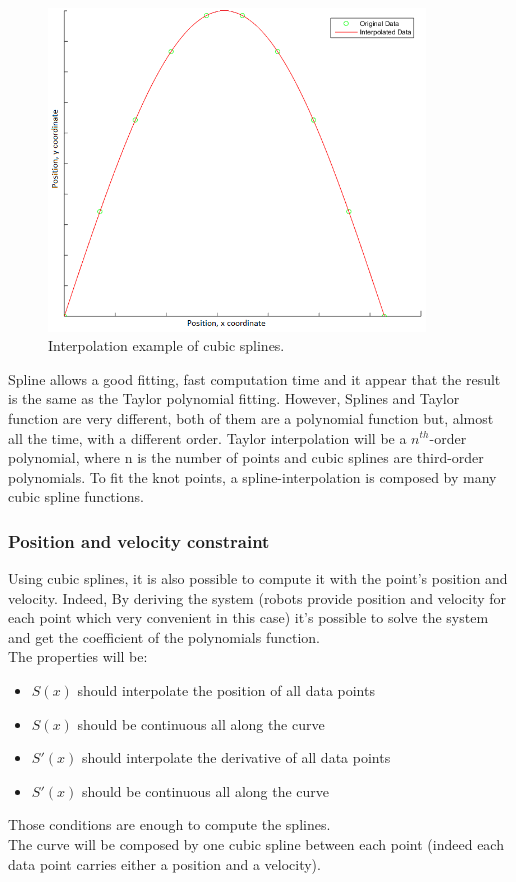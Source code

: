 \begin{figure}[H]
\centering
\includegraphics[width=10cm]{img/splines.png}
\caption{Interpolation example of cubic splines.}
\label{Spline_interpolation_fig}
\end{figure}

Spline allows a good fitting, fast computation time and it appear that the result is the same as the Taylor polynomial fitting. However, Splines and Taylor function are very different, both of them are a polynomial function but, almost all the time, with a different order. Taylor interpolation will be a $n^{th}$-order polynomial, where n is the number of points and cubic splines are third-order polynomials. To fit the knot points, a spline-interpolation is composed by many cubic spline functions.

\clearpage
\subsubsection{Position and velocity constraint}

Using cubic splines, it is also possible to compute it with the point's position and velocity. Indeed, By deriving the system (robots provide position and velocity for each point which very convenient in this case) it's possible to solve the system and get the coefficient of the polynomials function.\\
The properties will be: 
\begin{itemize}  

        \item $S(x)$ should interpolate the position of all data points

        \item $S(x)$ should be continuous all along the curve

        \item $S'(x)$ should interpolate the derivative of all data points

        \item $S'(x)$ should be continuous all along the curve

\end{itemize}
Those conditions are enough to compute the splines.\\
The curve will be composed by one cubic spline between each point (indeed each data point carries either a position and a velocity).

